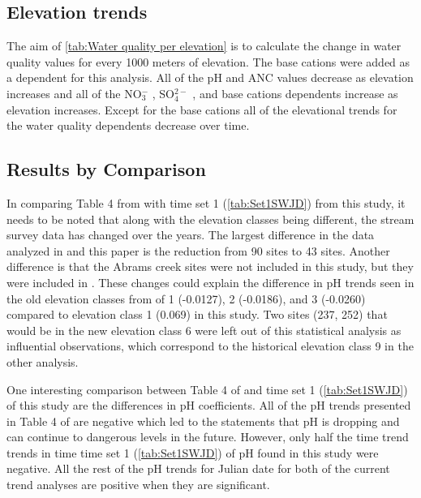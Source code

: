 \subsection{Elevation trends}



The aim of \autoref{tab:Water quality per elevation} is to calculate the change in water quality values for every 1000 meters of elevation.  
The base cations were added as a dependent for this analysis. 
All of the pH and ANC values decrease as elevation increases and all of the  NO$_3^-$ , SO$_4^{2-}$ , and base cations dependents increase as elevation increases. 
Except for the base cations all of the elevational trends for the water quality dependents decrease over time.

\subsection{Results by Comparison}

In comparing Table 4 from \citet{robinson2008ph} with time set 1 (\autoref{tab:Set1SWJD}) from this study, it needs to be noted that along with the elevation classes being different, the stream survey data has changed over the years. 
The largest difference in the data analyzed in \citet{robinson2008ph} and this paper is the reduction from 90 sites to 43 sites. 
Another difference is that the Abrams creek sites were not included in this study, but they were included in \citet{robinson2008ph}. 
These changes could explain the difference in pH trends seen in the old elevation classes from \citet{robinson2008ph} of 1 (-0.0127), 2 (-0.0186), and 3 (-0.0260) compared to elevation class 1 (0.069) in this study. 
Two sites (237, 252) that would be in the new elevation class 6 were left out of this statistical analysis as influential observations, which correspond to the historical elevation class 9 in the other analysis. 

One interesting comparison between Table 4 of \citet{robinson2008ph} and time set 1 (\autoref{tab:Set1SWJD}) of this study are the differences in pH coefficients. 
All of the pH trends presented in Table 4 of \citet{robinson2008ph} are negative which led to the statements that pH is dropping and can continue to dangerous levels in the future. 
However, only half the time trend trends in time time set 1 (\autoref{tab:Set1SWJD}) of pH found in this study were negative. 
All the rest of the pH trends for Julian date for both of the current trend analyses are positive when they are significant.


